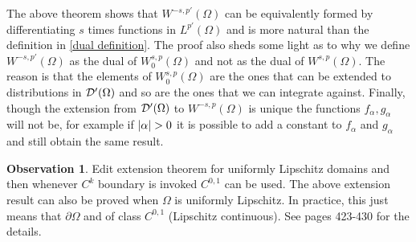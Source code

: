 \documentclass[12pt]{article}
\theoremstyle{definition}
\newtheorem{observation}{Observation}
\begin{document}
The above theorem shows that $W^{-s,p'}(\Omega )$ can be equivalently formed by differentiating $s$ times functions in $L^{p'}(\Omega )$ and is more natural than the definition in \eqref{dual definition}. The proof also sheds some light as to why we define $W^{-s,p'}(\Omega )$ as the dual of $W^{s,p}_0(\Omega )$ and not as the dual of $W^{s,p}(\Omega )$. The reason is that the elements of $W^{s,p}_0(\Omega )$ are the ones that can be extended to distributions in $\mathcal{D}'(\Omega )$ and so are the ones that we can integrate against. Finally, though the extension from $\mathcal{D}'(\Omega )$ to $W^{-s,p}(\Omega )$ is unique the functions $f_\alpha, g_\alpha$ will not be, for example if $\abs{\alpha}>0$ it is possible to add a constant to $f_\alpha$ and $g_\alpha$ and still obtain the same result.

\begin{observation}
	Edit extension theorem for uniformly Lipschitz domains and then whenever $C^k$ boundary is invoked $C^{0,1}$ can be used.	The above extension result can also be proved when $\Omega$ is uniformly Lipschitz. In practice, this just means that $\partial\Omega$ and of class $C^{0,1}$ (Lipschitz continuous). See \cite{leoni2017first} pages 423-430 for the details.
\end{observation}










\end{document}
